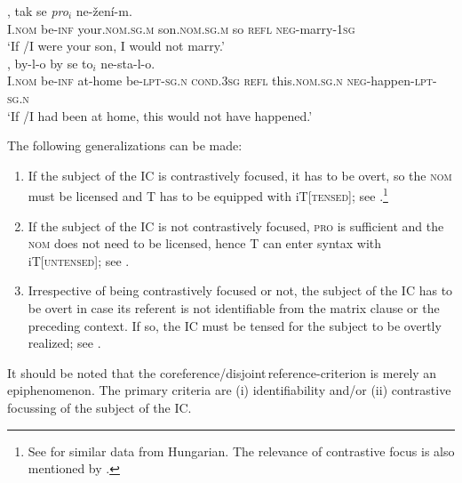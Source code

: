 \documentclass[output=paper,colorlinks,citecolor=brown,
modfonts,newtxmath
]{langscibook}
\begin{document}
\begin{itemize}
\ea\label{ex:son}
\ea\label{ex:son-a}
, tak se \textit{pro}$_i$ ne-žení-m.\\
	{} I.\textsc{nom} be-\textsc{inf} your.\textsc{nom.sg.m} son.\textsc{nom.sg.m} so \textsc{refl} {} \textsc{neg}-marry-\textsc{1sg} \\ 
\glt `If /I were your son, I would not marry.'\\\xspace\hfill \citep[Czech;][12]{Milotova2012}
\ex\label{ex:son-b}
, by-l-o by se to$_i$ ne-sta-l-o.\\
	{} I.\textsc{nom} be-\textsc{inf} {at-home} be-\textsc{lpt-sg.n} \textsc{cond.3sg} \textsc{refl} this.\textsc{nom.sg.n} \textsc{neg}-happen-\textsc{lpt-sg.n}\\
\glt `If /I had been at home, this would not have happened.'
\z
\z

\end{itemize}

\noindent The following generalizations can be made:

\begin{enumerate}

\item If the subject of the IC is contrastively focused, it has to be overt, so the \textsc{nom} must be licensed and T has to be equipped with iT[\textsc{tensed}]; see .\footnote{See \citet{Szabolcsi2009} for similar data from Hungarian. The relevance of contrastive focus is also mentioned by \citet[513]{McFaddenSundaresan2018}.}

\item If the subject of the IC is not contrastively focused, \textsc{pro} is sufficient and the \textsc{nom} does not need to be licensed, hence T can enter syntax with iT[\textsc{untensed}]; see . 

\item Irrespective of being contrastively focused or not, the subject of the IC has to be overt in case its referent is not identifiable from the matrix clause or the preceding context. If so, the IC must be tensed for the subject to be overtly realized; see .

\end{enumerate}

\noindent It should be noted that the coreference/disjoint\,reference-criterion is merely an epiphenomenon. The primary criteria are (i) identifiability and/or (ii) contrastive focussing of the subject of the IC.
\end{document}

